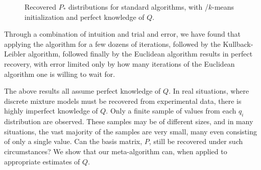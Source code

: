 \documentclass[conference]{IEEEtran}
\begin{document}
\begin{figure}[t]
\begin{center}
\end{center}
\caption{Recovered $P_*$ distributions for standard  algorithms, with /$k$-means initialization and perfect knowledge of $Q$.}
\end{figure}


Through a combination of intuition and trial and error, we have found that applying the  algorithm for a few dozens of iterations, followed by the Kullback-Leibler algorithm, followed finally by the Euclidean algorithm results in perfect recovery, with error limited only by how many iterations of the Euclidean algorithm one is willing to wait for.

The above results all assume perfect knowledge of $Q$.
In real situations, where discrete mixture models must be recovered from experimental data, there is highly imperfect knowledge of $Q$.
Only a finite sample of values from each $q_i$ distribution are observed.
These samples may be of different sizes, and in many situations, the vast majority of the samples are very small, many even consisting of only a single value.
Can the basis matrix, $P$, still be recovered under such circumstances?
We show that our meta-algorithm can, when applied to appropriate estimates of $Q$.
\end{document}
